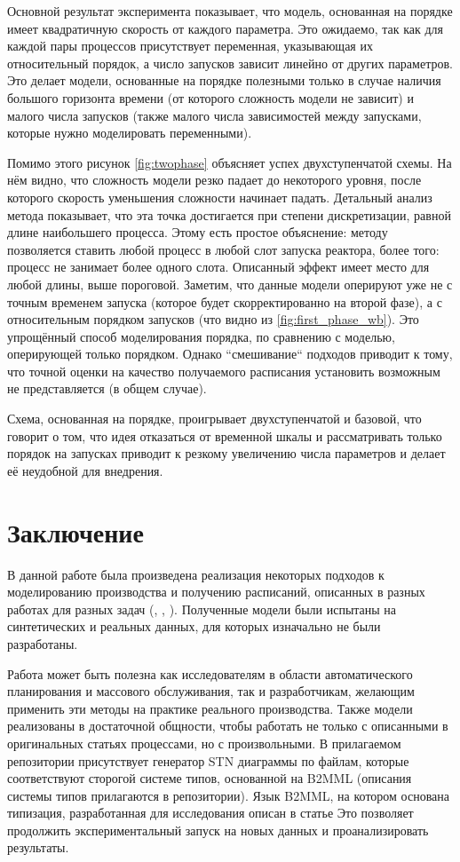 \documentclass[12pt, twoside]{article}
\theoremstyle{definition}
\begin{document}
Основной результат эксперимента показывает, что модель, основанная на порядке имеет квадратичную скорость от каждого параметра. Это ожидаемо, так как для каждой пары процессов присутствует переменная, указывающая их относительный порядок, а число запусков зависит линейно от других параметров. Это делает модели, основанные на порядке полезными только в случае наличия большого горизонта времени (от которого сложность модели не зависит) и малого числа запусков (также малого числа зависимостей между запусками, которые нужно моделировать переменными).

Помимо этого рисунок \ref{fig:twophase} объясняет успех двухступенчатой схемы. На нём видно, что сложность модели резко падает до некоторого уровня, после которого скорость уменьшения сложности начинает падать. Детальный анализ метода показывает, что эта точка достигается при степени дискретизации, равной длине наибольшего процесса. Этому есть простое объяснение: методу позволяется ставить любой процесс в любой слот запуска реактора, более того: процесс не занимает более одного слота. Описанный эффект имеет место для любой длины, выше пороговой. Заметим, что данные модели оперируют уже не с точным временем запуска (которое будет скорректированно на второй фазе), а с относительным порядком запусков (что видно из \ref{fig:first_phase_wb}). Это упрощённый способ моделирования порядка, по сравнению с моделью, оперирующей только порядком. Однако ``смешивание`` подходов приводит к тому, что точной оценки на качество получаемого расписания установить возможным не представляется (в общем случае).

Схема, основанная на порядке, проигрывает двухступенчатой и базовой, что говорит о том, что идея отказаться от временной шкалы и рассматривать только порядок на запусках приводит к резкому увеличению числа параметров и делает её неудобной для внедрения.

\section{Заключение}
В данной работе была произведена реализация некоторых подходов к моделированию производства и получению расписаний, описанных в разных работах для разных задач (\cite{lpheuristic}, \cite{reallife}, \cite{precendancebased}). Полученные модели были испытаны на синтетических и реальных данных, для которых изначально не были разработаны.

Работа может быть полезна как исследователям в области автоматического планирования и массового обслуживания, так и разработчикам, желающим применить эти методы на практике реального производства. Также модели реализованы в достаточной общности, чтобы работать не только с описанными в оригинальных статьях процессами, но с произвольными. В прилагаемом репозитории присутствует генератор STN диаграммы по файлам, которые соответствуют сторогой системе типов, основанной на B2MML (описания системы типов прилагаются в репозитории). Язык B2MML, на котором основана типизация, разработанная для исследования описан в статье \cite{b2mml} Это позволяет продолжить экспериментальный запуск на новых данных и проанализировать результаты.
\end{document}
